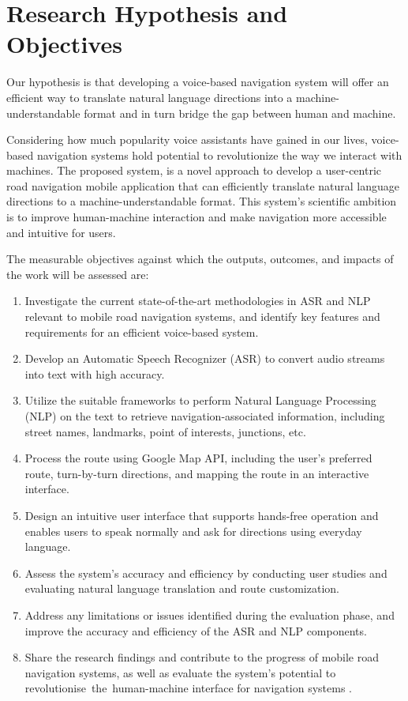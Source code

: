 \documentclass{epsrc}
\begin{document}
\part{Research Hypothesis and Objectives}
\vspace{5pt}

Our hypothesis is that developing a voice-based navigation system will offer an efficient way to translate natural language directions into a machine-understandable format and in turn bridge the gap between human and machine.
\vspace{5pt}

Considering how much popularity voice assistants have gained in our lives, voice-based navigation systems hold potential to revolutionize the way we interact with machines. The proposed system, is a novel approach to develop a user-centric road navigation mobile application that can efficiently translate natural language directions to a machine-understandable format. This system's scientific ambition is to improve human-machine interaction and make navigation more accessible and intuitive for users.
\vspace{5pt}

The measurable objectives against which the outputs, outcomes, and impacts of the work will be assessed are:
\vspace{5pt}
\begin{enumerate}
    \item Investigate the current state-of-the-art methodologies in ASR and NLP relevant to mobile road navigation systems, and identify key features and requirements for an efficient voice-based system.
    \item Develop an Automatic Speech Recognizer (ASR) to convert audio streams into text with high accuracy.
    \item Utilize the suitable frameworks to perform Natural Language Processing (NLP) on the text to retrieve navigation-associated information, including street names, landmarks, point of interests, junctions, etc.
    \item Process the route using Google Map API, including the user's preferred route, turn-by-turn directions, and mapping the route in an interactive interface.
    \item Design an intuitive user interface that supports hands-free operation and enables users to speak normally and ask for directions using everyday language.
    \item Assess the system's accuracy and efficiency by conducting user studies and evaluating natural language translation and route customization.
    \item Address any limitations or issues identified during the evaluation phase, and improve the accuracy and efficiency of the ASR and NLP components.
    \item Share the research findings and contribute to the progress of mobile road navigation systems, as well as evaluate the system's potential to revolutionise the human-machine interface for navigation systems .
\end{enumerate}
\vspace{5pt}
\end{document}
